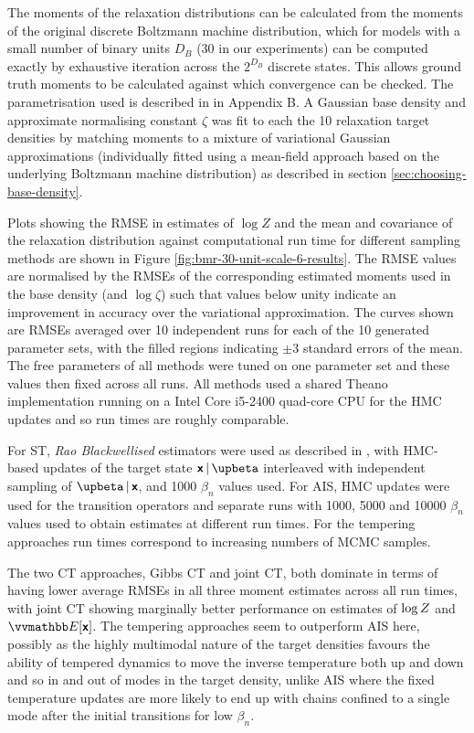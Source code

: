 The moments of the relaxation distributions can be calculated from the moments of the original discrete Boltzmann machine distribution, which for models with a small number of binary units $D_B$ (30 in our experiments) can be computed exactly by exhaustive iteration across the $2^{D_B}$ discrete states. This allows ground truth moments to be calculated against which convergence can be checked. The parametrisation used is described in in Appendix B. A Gaussian base density and approximate normalising constant $\zeta$ was fit to each the 10 relaxation target densities by matching moments to a mixture of variational Gaussian approximations (individually fitted using a mean-field approach based on the underlying Boltzmann machine distribution) as described in section \ref{sec:choosing-base-density}.

Plots showing the \ac{RMSE} in estimates of $\log Z$ and the mean and covariance of the relaxation distribution against computational run time for different sampling methods are shown in Figure \ref{fig:bmr-30-unit-scale-6-results}. The \ac{RMSE} values are normalised by the \ac{RMSE}s of the corresponding estimated moments used in the base density (and $\log\zeta$) such that values below unity indicate an improvement in accuracy over the variational approximation. The curves shown are \ac{RMSE}s averaged over 10 independent runs for each of the 10 generated parameter sets, with the filled regions indicating $\pm 3$ standard errors of the mean. The free parameters of all methods were tuned on one parameter set and these values then fixed across all runs. All methods used a shared Theano \citep{theano2016theano} implementation running on a Intel Core i5-2400 quad-core CPU for the \ac{HMC} updates and so run times are roughly comparable.

For \ac{ST}, \emph{Rao Blackwellised} estimators were used as described in \citep{carlson2016partition}, with \ac{HMC}-based updates of the target state $\rvct{x} \gvn \upbeta$ interleaved with independent sampling of $\upbeta \gvn \rvct{x}$, and 1000 $\beta_n$ values used. For \ac{AIS}, \ac{HMC} updates were used for the transition operators and separate runs with 1000, 5000 and 10000 $\beta_n$ values used to obtain estimates at different run times. For the tempering approaches run times correspond to increasing numbers of \ac{MCMC} samples.

The two \ac{CT} approaches, Gibbs \ac{CT} and joint \ac{CT}, both dominate in terms of having lower average \ac{RMSEs} in all three moment estimates across all run times, with joint \ac{CT} showing marginally better performance on estimates of $\log Z$ and $\expc{\rvct{x}}$. The tempering approaches seem to outperform \ac{AIS} here, possibly as the highly multimodal nature of the target densities favours the ability of tempered dynamics to move the inverse temperature both up and down and so in and out of modes in the target density, unlike \ac{AIS} where the fixed temperature updates are more likely to end up with chains confined to a single mode after the initial transitions for low $\beta_n$.

